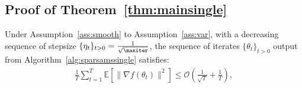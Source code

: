 \documentclass[11pt]{article}
\begin{document}
%
%
%
%
% 
%
%




\subsection{Proof of Theorem~\ref{thm:mainsingle}}

\begin{Theorem*}
Under Assumption~\ref{ass:smooth} to Assumption~\ref{ass:var}, with a decreasing sequence of stepsize $\{\eta_t\}_{t>0} = \frac{1}{\sqrt{\maxiter}}$, the sequence of iterates $\{\theta_t\}_{t>0}$ output from Algorithm~\ref{alg:sparsamssingle} satisfies:
\begin{align*}
    \frac{1}{T}\sum_{t=1}^T \mathbb E[\|\nabla f(\theta_t)\|^2]\leq \mathcal O(\frac{1}{\sqrt T}+\frac{1}{T}),
\end{align*}

\end{Theorem*}
\end{document}
